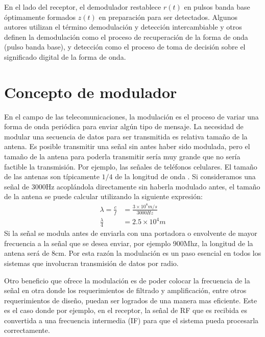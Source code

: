 En el lado del receptor, el demodulador restablece $r(t)$ en pulsos banda base
\'optimamente formados $z(t)$ en preparaci\'on para ser detectados. Algunos
autores utilizan el t\'ermino demodulaci\'on y detecci\'on intercambiable y
otros definen la demodulaci\'on como el proceso de recuperaci\'on de la forma de
onda (pulso banda base), y detecci\'on como el proceso de toma de decisi\'on
sobre el significado digital de la forma de onda.

\section{Concepto de modulador}

En el campo de las telecomunicaciones, la modulaci\'on es el proceso de variar
una forma de onda peri\'odica para enviar alg\'un tipo de mensaje. La necesidad
de modular una secuencia de datos para ser transmitida es relativa tama\~no de
la antena. Es posible transmitir una se\~nal sin antes haber sido modulada, pero
el tama\~no de la antena para poderla transmitir ser\'ia muy grande que no
ser\'ia factible la transmisi\'on. Por ejemplo, las se\~nales de tel\'efonos
celulares. El tama\~no de las antenas son t\'ipicamente $1/4$ de la longitud de onda
\cite{sklar}. Si consideramos una se\~nal de 3000Hz acopl\'andola directamente
sin haberla modulado antes, el tama\~no de la antena se puede calcular
utilizando la siguiente expresi\'on:
\begin{equation}
\begin{aligned}
\lambda=\frac{c}{f}&=\frac{3\times10^8m/s}{3000Hz}\\
\frac{\lambda}{4}&=2.5\times10^4m
\end{aligned}
\end{equation}
Si la se\~nal se modula antes de enviarla con una portadora o envolvente de
mayor frecuencia a la se\~nal que se desea enviar, por ejemplo 900Mhz, la longitud de la antena ser\'a de 8cm. Por esta raz\'on
la modulaci\'on es un paso esencial en todos los sistemas que involucran transmisi\'on de datos por
radio.

Otro beneficio que ofrece la modulaci\'on es de poder colocar la frecuencia de la se\~nal en otra
donde los requerimientos de filtrado y amplificaci\'on, entre otros requerimientos de dise\~no,
puedan ser logrados de una manera mas eficiente. Este es el caso donde por ejemplo, en el receptor,
la se\~nal de RF que es recibida es convertida a una frecuencia intermedia (IF) para que el sistema
pueda procesarla correctamente.

